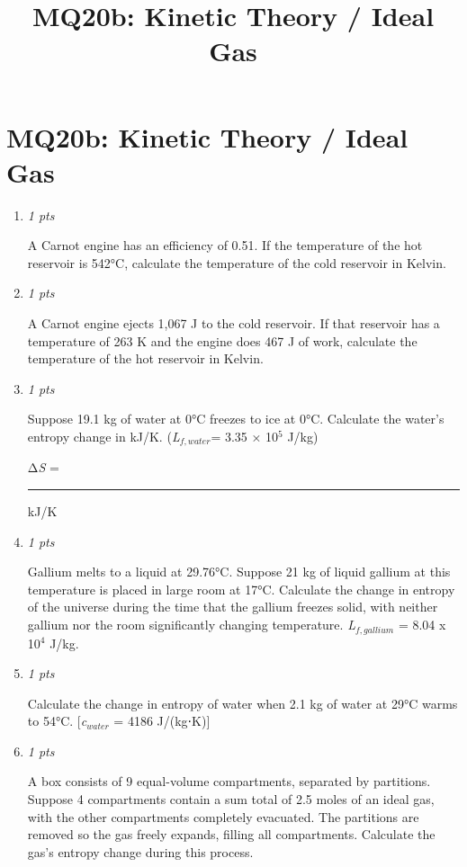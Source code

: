 \documentclass[11pt]{article}
\title{MQ20b: Kinetic Theory / Ideal Gas}
\author{}
\date{}
\begin{document}
\maketitle

\section*{MQ20b: Kinetic Theory / Ideal Gas}

\begin{enumerate}[leftmargin=*,label=\textbf{Question \arabic*.}]

\item \hfill \textit{1 pts}

A Carnot engine has an efficiency of 0.51. If the temperature of the hot reservoir is 542°C, calculate the temperature of the cold reservoir in Kelvin.

\item \hfill \textit{1 pts}

A Carnot engine ejects 1,067 J to the cold reservoir. If that reservoir has a temperature of 263 K and the engine does 467 J of work, calculate the temperature of the hot reservoir in Kelvin.

\item \hfill \textit{1 pts}

Suppose 19.1 kg of water at 0°C freezes to ice at 0°C. Calculate the water's entropy change in kJ/K. (\emph{L}$_{f,water}$= 3.35 × 10$^{5}$ J/kg)



Δ\emph{S} = \rule{2.5cm}{0.4pt} kJ/K

\item \hfill \textit{1 pts}

Gallium melts to a liquid at 29.76°C. Suppose 21 kg of liquid gallium at this temperature is placed in large room at 17°C. Calculate the change in entropy of the universe during the time that the gallium freezes solid, with neither gallium nor the room significantly changing temperature. \emph{L}$_{f,gallium}$ = 8.04 x 10$^{4}$ J/kg.

\item \hfill \textit{1 pts}

Calculate the change in entropy of water when 2.1 kg of water at 29°C warms to  54°C.   [\emph{c}$_{water}$ = 4186 J/(kg⋅K)]

\item \hfill \textit{1 pts}

A box consists of 9 equal-volume compartments, separated by partitions. Suppose 4 compartments contain a sum total of 2.5 moles of an ideal gas, with the other compartments completely evacuated. The partitions are removed so the gas freely expands, filling all compartments. Calculate the gas's entropy change during this process.


\end{enumerate}
\end{document}
